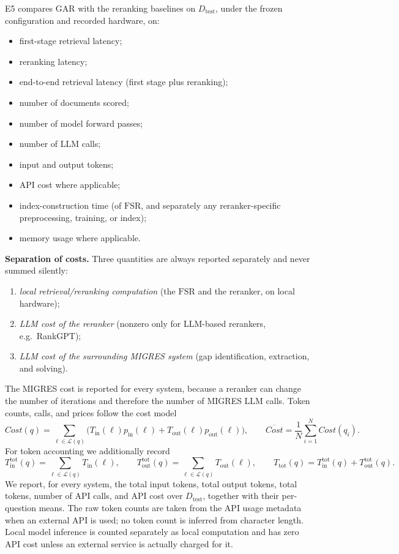 \documentclass[11pt,a4paper]{article}
\begin{document}
E5 compares GAR with the reranking baselines on $D_{\mathrm{test}}$, under the frozen configuration and recorded hardware, on:
\begin{itemize}[leftmargin=1.5em]
\item first-stage retrieval latency;
\item reranking latency;
\item end-to-end retrieval latency (first stage plus reranking);
\item number of documents scored;
\item number of model forward passes;
\item number of LLM calls;
\item input and output tokens;
\item API cost where applicable;
\item index-construction time (of $\mathrm{FSR}$, and separately any reranker-specific preprocessing, training, or index);
\item memory usage where applicable.
\end{itemize}

\textbf{Separation of costs.} Three quantities are always reported separately and never summed silently:
\begin{enumerate}[leftmargin=1.5em]
\item \emph{local retrieval/reranking computation} (the $\mathrm{FSR}$ and the reranker, on local hardware);
\item \emph{LLM cost of the reranker} (nonzero only for LLM-based rerankers, e.g.\ RankGPT);
\item \emph{LLM cost of the surrounding MIGRES system} (gap identification, extraction, and solving).
\end{enumerate}
The MIGRES cost is reported for every system, because a reranker can change the number of iterations and therefore the number of MIGRES LLM calls. Token counts, calls, and prices follow the cost model
\[
\boxed{
Cost(q)
=
\sum_{\ell\in\mathcal{L}(q)}
\Big(
T_{\mathrm{in}}(\ell)p_{\mathrm{in}}(\ell)
+
T_{\mathrm{out}}(\ell)p_{\mathrm{out}}(\ell)
\Big),
\qquad
\overline{Cost}=\frac{1}{N}\sum_{i=1}^{N}Cost(q_i).
}
\]
For token accounting we additionally record
\[
\boxed{
T_{\mathrm{in}}^{\mathrm{tot}}(q)=\sum_{\ell\in\mathcal{L}(q)}T_{\mathrm{in}}(\ell),
\qquad
T_{\mathrm{out}}^{\mathrm{tot}}(q)=\sum_{\ell\in\mathcal{L}(q)}T_{\mathrm{out}}(\ell),
\qquad
T_{\mathrm{tot}}(q)=T_{\mathrm{in}}^{\mathrm{tot}}(q)+T_{\mathrm{out}}^{\mathrm{tot}}(q).
}
\]
We report, for every system, the total input tokens, total output tokens, total tokens, number of API calls, and API cost over $D_{\mathrm{test}}$, together with their per-question means. The raw token counts are taken from the API usage metadata when an external API is used; no token count is inferred from character length. Local model inference is counted separately as local computation and has zero API cost unless an external service is actually charged for it.
\end{document}
